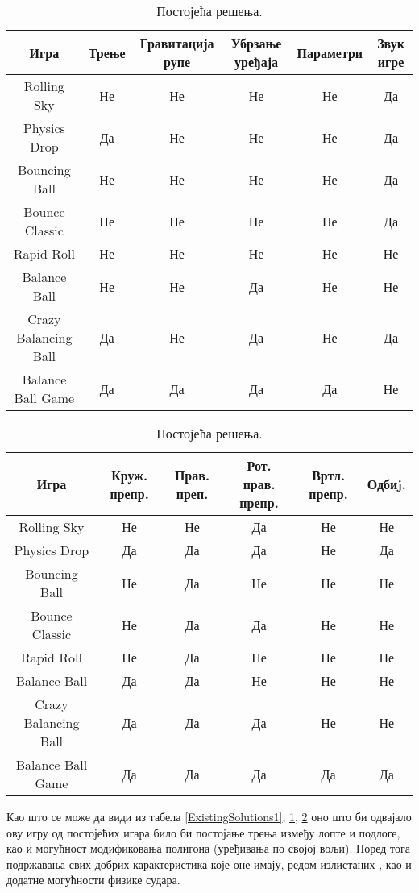 \begin{table}[H]
\begin{tabular}{|c|c|c|c|c|c|}
\hline 
Игра & Трење & Гравитација рупе& Убрзање уређаја& Параметри& Звук игре \\ 
\hline 
Rolling Sky & Не & Не &  Не& Не&Да\\ 
Physics Drop & Да & Не &  Не & Не&Да\\ 
Bouncing Ball  & Не & Не&  Не& Не&Да\\
Bounce Classic  & Не & Не &  Не& Не&Да\\ 
Rapid Roll & Не & Не&  Не& Не&Не\\ 
Balance Ball  & Не & Не&  Да &Не&Не\\ 
Crazy Balancing Ball & Да & Не&  Да &Не&Да\\ 
Balance Ball Game & Да & Да & Да & Да&Не\\

\hline 	
\end{tabular} 

\caption{Постојећа решења.} \label{ExistingSolutions2}
\end{table}



\begin{table}[H]
\begin{tabular}{|c|c|c|c|c|c|}
\hline 
Игра & Круж. препр.& Прав. преп.& Рот. прав. препр.& Вртл. препр.& Одбиj.\\ 
\hline 
Rolling Sky  & Не & Не &  Да&Не&Не\\ 
Physics Drop  & Да & Да &  Да & Не&Да\\ 
Bouncing Ball & Не & Да&  Не& Не&Не\\
Bounce Classic & Не & Да &  Да& Не&Не\\ 
Rapid Roll  & Не & Да&  Не& Не&Не\\ 
Balance Ball& Да & Да&  Не &Не&Не\\ 
Crazy Balancing Ball & Да & Да&  Да &Не&Не\\ 
Balance Ball Game & Да & Да & Да & Да&Да\\

\hline 	
\end{tabular} 

\caption{Постојећа решења.} \label{ExistingSolutions3}
\end{table}


Као што се може да види из табела \ref{ExistingSolutions1}, \ref{ExistingSolutions2}, \ref{ExistingSolutions3} оно што би одвајало ову игру од постојећих игара било би постојање трења између лопте и подлоге, као и могућност модификовања полигона (уређивања по својој вољи). Поред тога подржавања свих добрих карактеристика које оне имају, редом излистаних , као и додатне могућности физике судара. 



